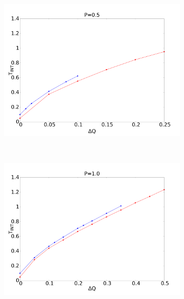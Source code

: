 \documentclass[12pt]{article}
\begin{document}
\begin{figure}[h]
\begin{center}
\begin{subfigure}[t]{0.3\textwidth}
            \includegraphics[scale=0.13]{images/p05_int.pdf}
        \end{subfigure} 
        \
        \begin{subfigure}[t]{0.3\textwidth}
            \includegraphics[scale=0.13]{images/p1_int.pdf}
        \end{subfigure} 
        \\
        \begin{subfigure}[t]{0.3\textwidth}

\end{subfigure}
\end{center}
\end{figure}
\end{document}
